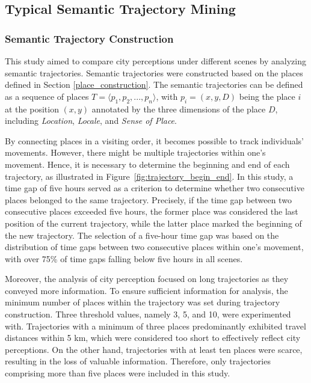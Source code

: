 \documentclass{article}
\theoremstyle{remark}
\begin{document}
\subsection{Typical Semantic Trajectory Mining} \label{typical_semantic_trajectory_mining}

\subsubsection{Semantic Trajectory Construction}
This study aimed to compare city perceptions under different scenes by analyzing semantic trajectories. Semantic trajectories were constructed based on the places defined in Section \ref{place_construction}. The semantic trajectories can be defined as a sequence of places $T = \langle p_{1}, p_{2}, ..., p_{n} \rangle$, with $p_{i} = (x,y,D)$ being the place $i$ at the position $(x,y)$ annotated by the three dimensions of the place $D$, including \textit{Location}, \textit{Locale}, and \textit{Sense of Place}.

By connecting places in a visiting order, it becomes possible to track individuals' movements. However, there might be multiple trajectories within one's movement. Hence, it is necessary to determine the beginning and end of each trajectory, as illustrated in Figure~\ref{fig:trajectory_begin_end}. In this study, a time gap of five hours served as a criterion to determine whether two consecutive places belonged to the same trajectory. Precisely, if the time gap between two consecutive places exceeded five hours, the former place was considered the last position of the current trajectory, while the latter place marked the beginning of the new trajectory. The selection of a five-hour time gap was based on the distribution of time gaps between two consecutive places within one's movement, with over 75\% of time gaps falling below five hours in all scenes. 

Moreover, the analysis of city perception focused on long trajectories as they conveyed more information. To ensure sufficient information for analysis, the minimum number of places within the trajectory was set during trajectory construction. Three threshold values, namely 3, 5, and 10, were experimented with. Trajectories with a minimum of three places predominantly exhibited travel distances within 5 km, which were considered too short to effectively reflect city perceptions. On the other hand, trajectories with at least ten places were scarce, resulting in the loss of valuable information. Therefore, only trajectories comprising more than five places were included in this study.
\end{document}
